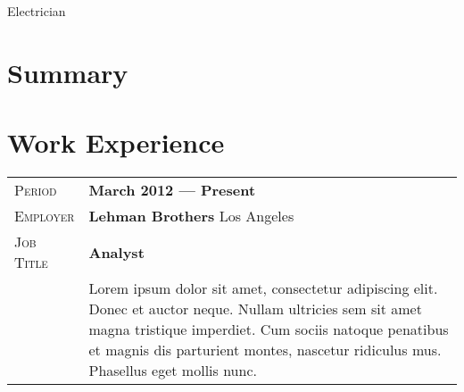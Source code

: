 \documentclass[a4paper, oneside, final]{scrartcl} %
\newcommand{\gray}{\rowcolor[gray]{.90}} %
\begin{document}
\begin{center} %


{\fontsize{36}{36}\selectfont\scshape  } %

\vspace{0.5cm} %
\gray Electrician
\vspace{1cm} %


\section{Summary}




\section{Work Experience}

\begin{tabularx}{0.97\linewidth}{>{\raggedleft\scshape}p{2cm}X}
\gray Period & \textbf{March 2012 --- Present}\\
\gray Employer & \textbf{Lehman Brothers} \hfill Los Angeles\\
\gray Job Title & \textbf{Analyst}\\
& Lorem ipsum dolor sit amet, consectetur adipiscing elit. Donec et auctor neque. Nullam ultricies sem sit amet magna tristique imperdiet. Cum sociis natoque penatibus et magnis dis parturient montes, nascetur ridiculus mus. Phasellus eget mollis nunc.
\end{tabularx}



\end{center}
\end{document}
